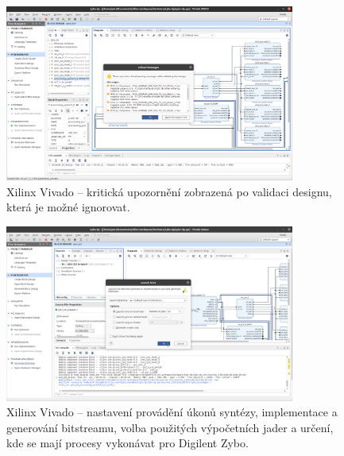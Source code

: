 \documentclass[a4paper, twoside, 11pt]{article}
\begin{document}
\begin{appendices}
		\begin{figure}[htbp!]
			\centering
			\includegraphics[width=0.85\textwidth]{src/png/zybo-xilinx-vivado-flow/zybo-xilinx-vivado-flow-24.jpg}
			\caption{Xilinx Vivado – kritická upozornění zobrazená po validaci designu, která je možné ignorovat.}
			\label{fig:zybo-xilinx-vivado-flow-24}
		\end{figure}


		\begin{figure}[htbp!]
			\centering
			\includegraphics[width=0.85\textwidth]{src/png/zybo-xilinx-vivado-flow/zybo-xilinx-vivado-flow-29.jpg}
			\caption{Xilinx Vivado – nastavení provádění úkonů syntézy, implementace a generování bitstreamu, volba použitých výpočetních jader a určení, kde se mají procesy vykonávat pro Digilent Zybo.}
			\label{fig:zybo-xilinx-vivado-flow-29}
		\end{figure}


\end{appendices}
\end{document}
